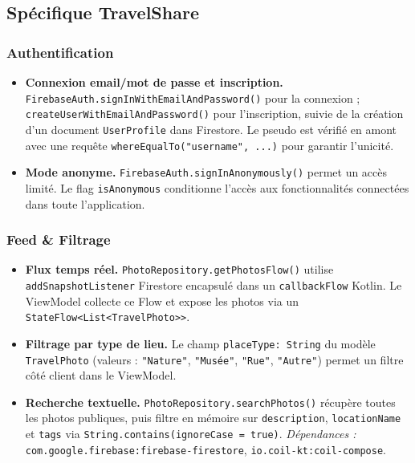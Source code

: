 \documentclass[a4paper, 12pt]{article}
\begin{document}
\begin{justify}
\begin{itemize}
\end{itemize}


\subsection*{Spécifique TravelShare}

\subsubsection*{Authentification}

\begin{itemize}

    \item \textbf{Connexion email/mot de passe et inscription.}
    \texttt{FirebaseAuth.\allowbreak{}signInWithEmailAndPassword()} pour la connexion ; \texttt{createUserWithEmailAndPassword()} pour l'inscription, suivie de la création d'un document \texttt{UserProfile} dans Firestore. Le pseudo est vérifié en amont avec une requête \texttt{whereEqualTo("username", ...)} pour garantir l'unicité.

    \item \textbf{Mode anonyme.}
    \texttt{FirebaseAuth.\allowbreak{}signInAnonymously()} permet un accès limité. Le flag \texttt{isAnonymous} conditionne l'accès aux fonctionnalités connectées dans toute l'application.

\end{itemize}

\subsubsection*{Feed \& Filtrage}

\begin{itemize}

    \item \textbf{Flux temps réel.}
    \texttt{PhotoRepository.\allowbreak{}getPhotosFlow()} utilise \texttt{addSnapshotListener} Firestore encapsulé dans un \texttt{callbackFlow} Kotlin. Le ViewModel collecte ce Flow et expose les photos via un \texttt{StateFlow<List<TravelPhoto>>}.

    \item \textbf{Filtrage par type de lieu.}
    Le champ \texttt{placeType:\allowbreak{} String} du modèle \texttt{TravelPhoto} (valeurs : \texttt{"Nature"}, \texttt{"Musée"}, \texttt{"Rue"}, \texttt{"Autre"}) permet un filtre côté client dans le ViewModel.

    \item \textbf{Recherche textuelle.}
    \texttt{PhotoRepository.\allowbreak{}searchPhotos()} récupère toutes les photos publiques, puis filtre en mémoire sur \texttt{description}, \texttt{locationName} et \texttt{tags} via \texttt{String.\allowbreak{}contains(ignoreCase = true)}.
    \newline\textit{Dépendances :} \texttt{com.\allowbreak{}google.\allowbreak{}firebase:\allowbreak{}firebase-firestore}, \texttt{io.\allowbreak{}coil-kt:\allowbreak{}coil-compose}.


\end{itemize}
\end{justify}
\end{document}
